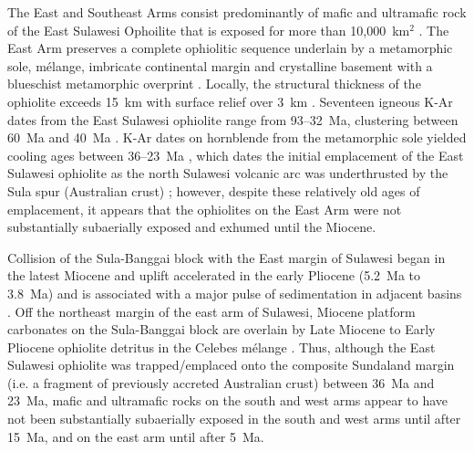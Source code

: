\documentclass[11pt,letterpaper]{article}
\begin{document}
The East and Southeast Arms consist predominantly of mafic and ultramafic rock of the East Sulawesi Ophoilite that is exposed for more than 10,000~km$^{2}$ \citep{Monnier1995a}. The East Arm preserves a complete ophiolitic sequence underlain by a metamorphic sole, m\'elange, imbricate continental margin and crystalline basement with a blueschist metamorphic overprint \citep{Silver1983a, Monnier1995a, Parkinson1998a}. Locally, the structural thickness of the ophiolite exceeds 15~km with surface relief over 3~km \citep{Kadarusman2004a}. Seventeen igneous K-Ar dates from the East Sulawesi ophiolite range from 93--32~Ma, clustering between 60~Ma and 40~Ma \citep{Parkinson1998b}. K-Ar dates on hornblende from the metamorphic sole yielded cooling ages between 36--23~Ma \citep{Parkinson1998a, Villeneuve2001a}, which dates the initial emplacement of the East Sulawesi ophiolite as the north Sulawesi volcanic arc was underthrusted by the Sula spur (Australian crust) \citep{Silver1983a, Parkinson1998a}; however, despite these relatively old ages of emplacement, it appears that the ophiolites on the East Arm were not substantially subaerially exposed and exhumed until the Miocene.  

Collision of the Sula-Banggai block with the East margin of Sulawesi began in the latest Miocene and uplift accelerated in the early Pliocene (5.2~Ma to 3.8~Ma) and is associated with a major pulse of sedimentation in adjacent basins \citep{Davies1990a, Villeneuve2000a}. Off the northeast margin of the east arm of Sulawesi, Miocene platform carbonates on the Sula-Banggai block are overlain by Late Miocene to Early Pliocene ophiolite detritus in the Celebes m\'elange \citep{Davies1990a}. Thus, although the East Sulawesi ophiolite was trapped/emplaced onto the composite Sundaland margin (i.e. a fragment of previously accreted Australian crust) between 36~Ma and 23~Ma, mafic and ultramafic rocks on the south and west arms appear to have not been substantially subaerially exposed in the south and west arms until after 15~Ma, and on the east arm until after 5~Ma.
\end{document}
